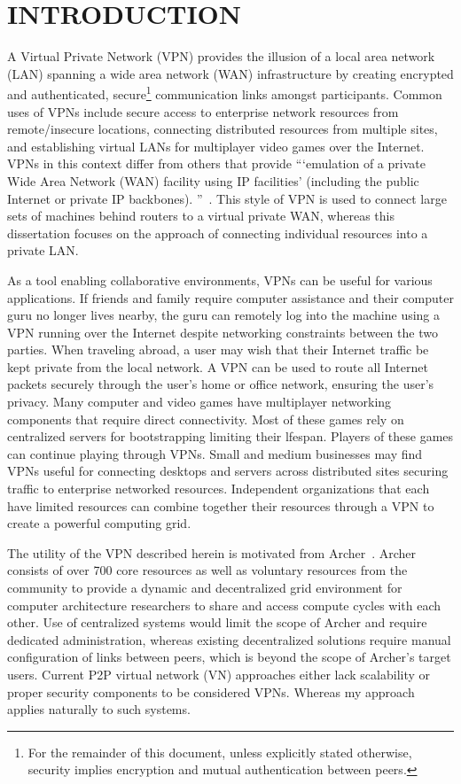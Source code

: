 \chapter{INTRODUCTION}
\label{introduction}

A Virtual Private Network (VPN) provides the illusion of a local area network
(LAN) spanning a wide area network (WAN) infrastructure by creating encrypted
and authenticated, secure\footnote{For the remainder of this document, unless
explicitly stated otherwise, security implies encryption and mutual
authentication between peers.} communication links amongst participants.
Common uses of VPNs include secure access to enterprise network resources from
remote/insecure locations, connecting distributed resources from multiple
sites, and establishing virtual LANs for multiplayer video games over the
Internet.  VPNs in this context differ from others that provide ```emulation of
a private Wide Area Network (WAN) facility using IP facilities' (including the
public Internet or private IP backbones).  ''~\cite{ip_vpns}.  This style of
VPN is used to connect large sets of machines behind routers to a virtual
private WAN, whereas this dissertation focuses on the approach of connecting
individual resources into a private LAN.

As a tool enabling collaborative environments, VPNs can be useful for various
applications.  If friends and family require computer assistance and their
computer guru no longer lives nearby, the guru can remotely log into the
machine using a VPN running over the Internet despite networking constraints
between the two parties.  When traveling abroad, a user may wish that their
Internet traffic be kept private from the local network.  A VPN can be used to
route all Internet packets securely through the user's home or office network,
ensuring the user's privacy.  Many computer and video games have multiplayer
networking components that require direct connectivity.  Most of these games
rely on centralized servers for bootstrapping limiting their lfespan.  Players
of these games can continue playing through VPNs.  Small and medium businesses
may find VPNs useful for connecting desktops and servers across distributed
sites securing traffic to enterprise networked resources.  Independent
organizations that each have limited resources can combine together their
resources through a VPN to create a powerful computing grid.

The utility of the VPN described herein is motivated from Archer~\cite{archer}.
Archer consists of over 700 core resources as well as voluntary resources from
the community to provide a dynamic and decentralized grid environment for
computer architecture researchers to share and access compute cycles with each
other.  Use of centralized systems would limit the scope of Archer and require
dedicated administration, whereas existing decentralized solutions require
manual configuration of links between peers, which is beyond the scope of
Archer's target users.  Current P2P virtual network (VN) approaches either lack
scalability or proper security components to be considered VPNs.  Whereas my
approach applies naturally to such systems.

